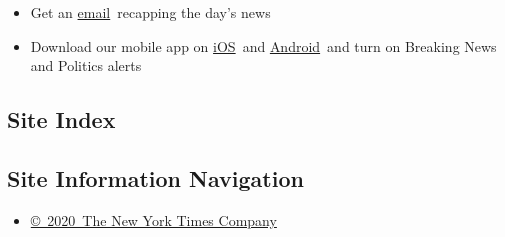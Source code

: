 \begin{itemize}
  \begin{itemize}
  \item
    Get an
    \href{https://www.nytimes3xbfgragh.onion/newsletters/politics?action=click\&pgtype=Article\&state=default\&region=BELOW_MAIN_CONTENT\&context=storylines_guide}{email}~recapping
    the day's news
  \item
    Download our mobile app on
    \href{https://apps.apple.com/us/app/nytimes/id284862083?ls=1\&mat_click_id=5c79ae7455014fd1bd66b5610c05b8f2-20191112-16948\&referrer=mat_click_id\%3D5c79ae7455014fd1bd66b5610c05b8f2-20191112-16948\%26link_click_id\%3D722930677036718082}{iOS}~and
    \href{http://a.localytics.com/android?id=com.nytimes.android\&referrer=utm_source\%3Dother_nyt_mobile_web\%26utm_medium\%3DWeb\%2520page\%26utm_term\%3DGeneral\%2520Mobile\%2520Page\%26utm_campaign\%3DNYT\%2520Mobile\%2520General\%2520Page}{Android}~and
    turn on Breaking News and Politics alerts
  \end{itemize}
\end{itemize}

\hypertarget{site-index}{%
\subsection{Site Index}\label{site-index}}

\hypertarget{site-information-navigation}{%
\subsection{Site Information
Navigation}\label{site-information-navigation}}

\begin{itemize}
\tightlist
\item
  \href{https://help.nytimes3xbfgragh.onion/hc/en-us/articles/115014792127-Copyright-notice}{©~2020~The
  New York Times Company}
\end{itemize}

